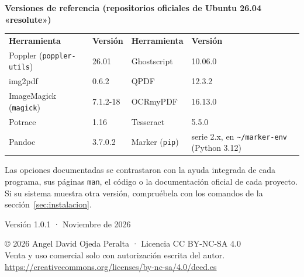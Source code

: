 \documentclass[11pt,a4paper]{article}
\newcommand{\versionguia}{1.0.1}
\begin{document}
\begin{titlepage}
		\begin{tcolorbox}[enhanced, colback=white, colframe=codigoborde, boxrule=0.5pt, arc=2pt,
			left=10pt, right=10pt, top=8pt, bottom=8pt, fontupper=\small]
			\textbf{\color{acento}Versiones de referencia (repositorios oficiales de Ubuntu 26.04 «resolute»)}\par\smallskip
			\begin{tabular}{@{}L{3.9cm}L{2.3cm}L{3.4cm}L{4.6cm}@{}}
				\textbf{Herramienta} & \textbf{Versión} & \textbf{Herramienta} & \textbf{Versión}\\[2pt]
				Poppler (\texttt{poppler-utils}) & 26.01 & Ghostscript & 10.06.0\\
				img2pdf & 0.6.2 & QPDF & 12.3.2\\
				ImageMagick (\texttt{magick}) & 7.1.2-18 & OCRmyPDF & 16.13.0\\
				Potrace & 1.16 & Tesseract & 5.5.0\\
				Pandoc & 3.7.0.2 & Marker (\texttt{pip}) & serie 2.x, en \texttt{\textasciitilde/marker-env} (Python 3.12)\\
			\end{tabular}
		\end{tcolorbox}
		
		\vfill
		{\small\color{collimit}Las opciones documentadas se contrastaron con la ayuda integrada de cada programa, sus páginas \texttt{man}, el código o la documentación oficial de cada proyecto. Si su sistema muestra otra versión, compruébela con los comandos de la sección~\ref{sec:instalacion}.}
		
		\vspace{0.4cm}
		{\sffamily\color{acento}Versión \versionguia{} · Noviembre de 2026}\par\smallskip
		{\footnotesize\color{collimit}© 2026 Angel David Ojeda Peralta · Licencia CC BY-NC-SA 4.0\\ Venta y uso comercial solo con autorización escrita del autor.\\ \url{https://creativecommons.org/licenses/by-nc-sa/4.0/deed.es}\par}
	\end{titlepage}
	
	\begingroup
	\hypersetup{linkcolor=black}
	\tableofcontents
	\endgroup
	\clearpage
	
\end{document}
